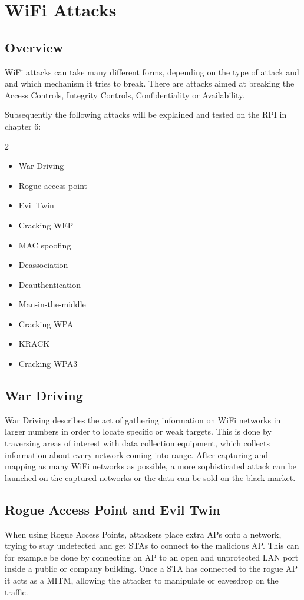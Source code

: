 \chapter{WiFi Attacks}\label{ch:wifi_attacks}
\section{Overview}
WiFi attacks can take many different forms, depending on the type of attack and and which mechanism it tries to break.
There are attacks aimed at breaking the Access Controls, Integrity Controls, Confidentiality or Availability.

Subsequently the following attacks will be explained and tested on the RPI in chapter 6:

\begin{multicols}{2}
    \begin{itemize}
        \item War Driving
        \item Rogue access point
        \item Evil Twin
        \item Cracking WEP
        \item MAC spoofing
        \item Deassociation
        \item Deauthentication
        \item Man-in-the-middle
        \item Cracking WPA
        \item KRACK
        \item Cracking WPA3
    \end{itemize}
\end{multicols}

\section{War Driving}
War Driving describes the act of gathering information on WiFi networks in larger numbers in order to locate specific or weak targets.
This is done by traversing areas of interest with data collection equipment, which collects information about every network coming into range.
After capturing and mapping as many WiFi networks as possible, a more sophisticated attack can be launched on the captured networks or the data can be sold on the black market. \cite{Oriyano_2017}

\section{Rogue Access Point and Evil Twin}
When using Rogue Access Points, attackers place extra APs onto a network, trying to stay undetected and get STAs to connect to the malicious AP.
This can for example be done by connecting an AP to an open and unprotected LAN port inside a public or company building.
Once a STA has connected to the rogue AP it acts as a MITM, allowing the attacker to manipulate or eavesdrop on the traffic.

